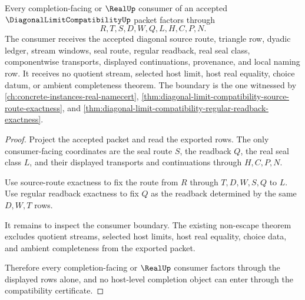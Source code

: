 \begin{theorem}
\label{thm:diagonal-limit-compatibility-completion-consumer-nonescape}
Every completion-facing or $\RealUp$ consumer of an accepted
$\DiagonalLimitCompatibilityUp$ packet factors through
$$
R,T,S,D,W,Q,L,H,C,P,N.
$$
The consumer receives the accepted diagonal source route, triangle row,
dyadic ledger, stream windows, seal route, regular readback, real seal class,
componentwise transports, displayed continuations, provenance, and local
naming row. It receives no quotient stream, selected host limit, host real
equality, choice datum, or ambient completeness theorem. The boundary is the
one witnessed by \autoref{ch:concrete-instances-real-namecert},
\autoref{thm:diagonal-limit-compatibility-source-route-exactness}, and
\autoref{thm:diagonal-limit-compatibility-regular-readback-exactness}.
\end{theorem}
\begin{proof}
Project the accepted packet and read the exported rows. The only
consumer-facing coordinates are the seal route $S$, the readback $Q$, the
real seal class $L$, and their displayed transports and continuations through
$H,C,P,N$.

Use source-route exactness to fix the route from $R$ through $T,D,W,S,Q$ to
$L$. Use regular readback exactness to fix $Q$ as the readback determined by
the same $D,W,T$ rows.

It remains to inspect the consumer boundary. The existing non-escape theorem
excludes quotient streams, selected host limits, host real equality, choice
data, and ambient completeness from the exported packet.

Therefore every completion-facing or $\RealUp$ consumer factors through the
displayed rows alone, and no host-level completion object can enter through
the compatibility certificate.
\end{proof}

